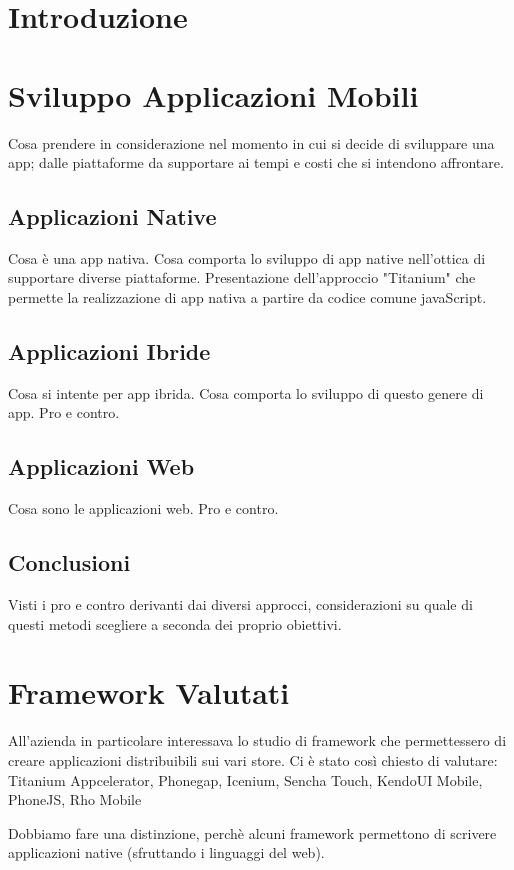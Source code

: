 \chapter{Introduzione}

\chapter{Sviluppo Applicazioni Mobili}
	Cosa prendere in considerazione nel momento in cui si decide di sviluppare
	una app; dalle piattaforme da supportare ai tempi e costi che si intendono
	affrontare.
	
	\section{Applicazioni Native}
		Cosa è una app nativa. Cosa comporta lo sviluppo di app native nell'ottica
		di supportare diverse piattaforme. Presentazione dell'approccio "Titanium" che
		permette la realizzazione di app nativa a partire da codice comune javaScript.
		
	\section{Applicazioni Ibride}
		Cosa si intente per app ibrida. Cosa comporta lo sviluppo di questo genere
		di app. Pro e contro.
		
	\section{Applicazioni Web}
		Cosa sono le applicazioni web. Pro e contro.
		
	\section{Conclusioni}
		Visti i pro e contro derivanti dai diversi approcci, considerazioni su
		quale di questi metodi scegliere a seconda dei proprio obiettivi.
		
		
\chapter{Framework Valutati}
	All'azienda in particolare interessava lo studio di framework che permettessero di creare 		    applicazioni distribuibili sui vari store. Ci è stato così chiesto di valutare: 
	Titanium Appcelerator, Phonegap, Icenium, Sencha Touch, KendoUI Mobile, PhoneJS, Rho Mobile
	
	Dobbiamo fare una distinzione, perchè alcuni framework permettono di scrivere applicazioni
	native (sfruttando i linguaggi del web).
